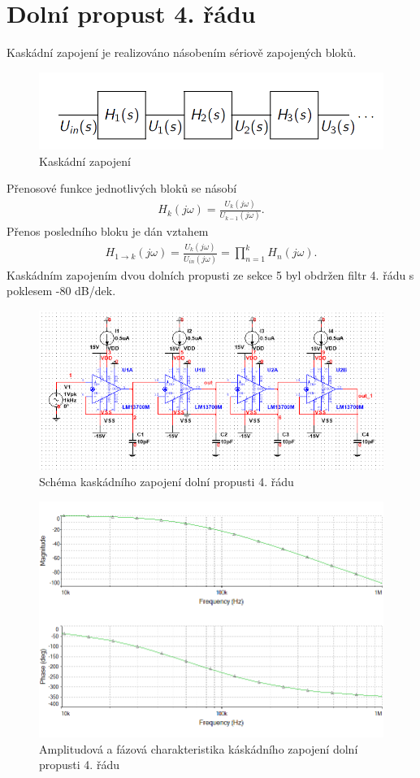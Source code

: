 \documentclass[twoside]{article}
\begin{document}
\section{Dolní propust 4. řádu}
Kaskádní zapojení je realizováno násobením sériově zapojených bloků.
\begin{figure}[H]
\centering
\includegraphics[scale=0.4]{schemata.png}
\caption{Kaskádní zapojení \cite{4}}
\end{figure}
Přenosové funkce jednotlivých bloků se násobí
\begin{align}
H_k(j\omega) = \frac{U_k (j\omega)}{U_{k-1}(j\omega)}.
\end{align}
Přenos posledního bloku je dán vztahem
\begin{align}
H_{1 \rightarrow k}(j\omega) = \frac{U_k (j\omega)}{U_{in}(j\omega)} = \prod _{n=1}^{k} H_n(j\omega).
\end{align}
Kaskádním zapojením dvou dolních propusti ze sekce 5 byl obdržen filtr 4. řádu s poklesem -80 dB/dek. 
\begin{figure}[H]
\centering
\includegraphics[scale=0.75]{1506.png}
\caption{Schéma kaskádního zapojení dolní propusti 4. řádu}
\end{figure}
\begin{figure}[H]
\centering
\includegraphics[scale=0.75]{15062.png}
\caption{Amplitudová a fázová charakteristika káskádního zapojení dolní propusti 4. řádu}
\end{figure}
\end{document}
